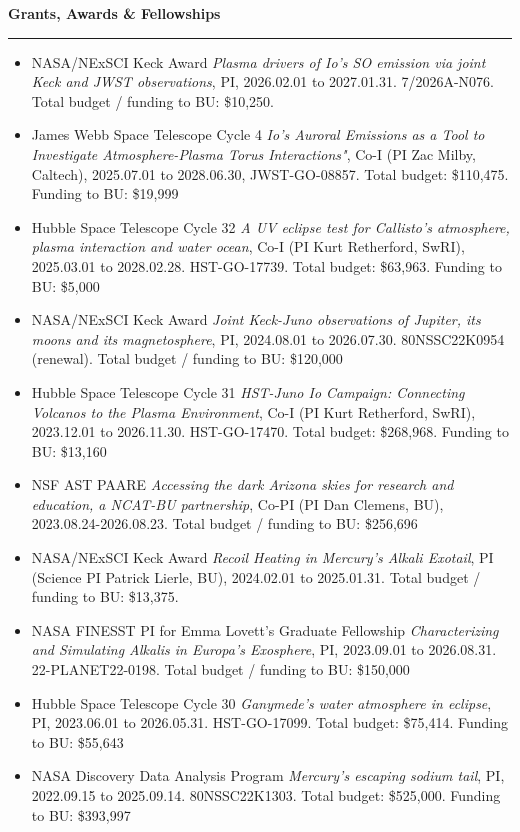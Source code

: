 \documentclass[12pt]{report}
\begin{document}
\noindent\bf{Grants, Awards \& Fellowships}\rm \hspace*{\fill} \\
\rule{\textwidth}{1pt}
\begin{itemize} \itemsep -2pt %
 \item NASA/NExSCI Keck Award {\it Plasma drivers of Io's SO emission via joint Keck and JWST observations}, PI, 2026.02.01 to 2027.01.31. 7/2026A-N076. Total budget / funding to BU: \$10,250.
 \item James Webb Space Telescope Cycle 4 {\it Io's Auroral Emissions as a Tool to Investigate Atmosphere-Plasma Torus Interactions"}, Co-I (PI Zac Milby, Caltech), 2025.07.01 to 2028.06.30, JWST-GO-08857. Total budget: \$110,475. Funding to BU: \$19,999
 \item Hubble Space Telescope Cycle 32 {\it A UV eclipse test for Callisto's atmosphere, plasma interaction and water ocean}, Co-I (PI Kurt Retherford, SwRI), 2025.03.01 to 2028.02.28. HST-GO-17739. Total budget: \$63,963. Funding to BU: \$5,000
 \item NASA/NExSCI Keck Award {\it Joint Keck-Juno observations of Jupiter, its moons and its magnetosphere}, PI, 2024.08.01 to 2026.07.30. 80NSSC22K0954 (renewal). Total budget / funding to BU: \$120,000
 \item Hubble Space Telescope Cycle 31 {\it HST-Juno Io Campaign: Connecting Volcanos to the Plasma Environment}, Co-I (PI Kurt Retherford, SwRI), 2023.12.01 to 2026.11.30. HST-GO-17470. Total budget: \$268,968. Funding to BU: \$13,160
 \item NSF AST PAARE {\it Accessing the dark Arizona skies for research and education, a NCAT-BU partnership}, Co-PI (PI Dan Clemens, BU), 2023.08.24-2026.08.23. Total budget / funding to BU: \$256,696
 \item NASA/NExSCI Keck Award {\it Recoil Heating in Mercury's Alkali Exotail}, PI (Science PI Patrick Lierle, BU), 2024.02.01 to 2025.01.31. Total budget / funding to BU: \$13,375.
 \item NASA FINESST PI for Emma Lovett's Graduate Fellowship {\it Characterizing and Simulating Alkalis in Europa’s Exosphere}, PI, 2023.09.01 to 2026.08.31. 22-PLANET22-0198. Total budget / funding to BU: \$150,000
 \item Hubble Space Telescope Cycle 30 {\it Ganymede's water atmosphere in eclipse}, PI, 2023.06.01 to 2026.05.31. HST-GO-17099. Total budget: \$75,414. Funding to BU: \$55,643
 \item NASA Discovery Data Analysis Program {\it Mercury's escaping sodium tail}, PI, 2022.09.15 to 2025.09.14. 80NSSC22K1303. Total budget: \$525,000. Funding to BU: \$393,997

\end{itemize}
\end{document}
